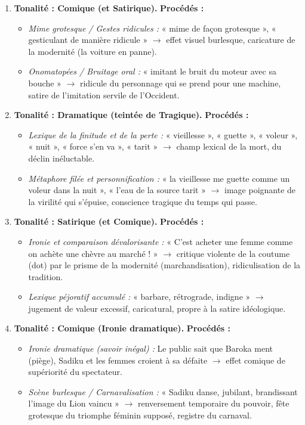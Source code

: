 \documentclass[11pt]{article}
\begin{document}
\begin{corrige}
\begin{enumerate}
    \item \textbf{Tonalité : Comique (et Satirique).}
    \textbf{Procédés :}
    \begin{itemize}
        \item \textit{Mime grotesque / Gestes ridicules :} « mime de façon grotesque », « gesticulant de manière ridicule » $\to$ effet visuel burlesque, caricature de la modernité (la voiture en panne).
        \item \textit{Onomatopées / Bruitage oral :} « imitant le bruit du moteur avec sa bouche » $\to$ ridicule du personnage qui se prend pour une machine, satire de l'imitation servile de l'Occident.
    \end{itemize}
    \item \textbf{Tonalité : Dramatique (teintée de Tragique).}
    \textbf{Procédés :}
    \begin{itemize}
        \item \textit{Lexique de la finitude et de la perte :} « vieillesse », « guette », « voleur », « nuit », « force s'en va », « tarit » $\to$ champ lexical de la mort, du déclin inéluctable.
        \item \textit{Métaphore filée et personnification :} « la vieillesse me guette comme un voleur dans la nuit », « l'eau de la source tarit » $\to$ image poignante de la virilité qui s'épuise, conscience tragique du temps qui passe.
    \end{itemize}
    \item \textbf{Tonalité : Satirique (et Comique).}
    \textbf{Procédés :}
    \begin{itemize}
        \item \textit{Ironie et comparaison dévalorisante :} « C'est acheter une femme comme on achète une chèvre au marché ! » $\to$ critique violente de la coutume (dot) par le prisme de la modernité (marchandisation), ridiculisation de la tradition.
        \item \textit{Lexique péjoratif accumulé :} « barbare, rétrograde, indigne » $\to$ jugement de valeur excessif, caricatural, propre à la satire idéologique.
    \end{itemize}
    \item \textbf{Tonalité : Comique (Ironie dramatique).}
    \textbf{Procédés :}
    \begin{itemize}
        \item \textit{Ironie dramatique (savoir inégal) :} Le public sait que Baroka ment (piège), Sadiku et les femmes croient à sa défaite $\to$ effet comique de supériorité du spectateur.
        \item \textit{Scène burlesque / Carnavalisation :} « Sadiku danse, jubilant, brandissant l'image du Lion vaincu » $\to$ renversement temporaire du pouvoir, fête grotesque du triomphe féminin supposé, registre du carnaval.
    \end{itemize}
\end{enumerate}
\end{corrige}
\end{document}
